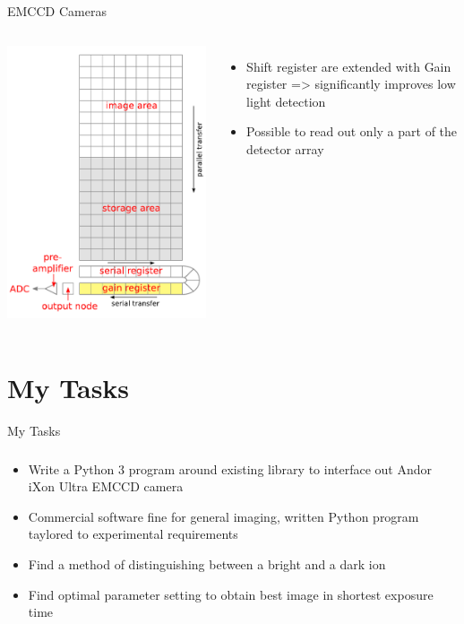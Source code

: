 \documentclass{beamer}
\begin{document}
\begin{frame}{EMCCD Cameras}




\begin{columns}
             \centering
             \includegraphics[width=4.3 cm]{Figures/EMCCD_Structure.PNG}
              \begin{itemize}
\item Shift register are extended with Gain register => significantly improves low light detection
\bigskip
\item Possible to read out only a part of the detector array
\end{itemize}
         \end{columns} 


\end{frame}


\section{My Tasks}

\begin{frame}{My Tasks}
\frametitle{}
\begin{itemize}
\item Write a Python 3 program around existing library to interface out Andor iXon Ultra EMCCD camera
\bigskip
\item Commercial software fine for general imaging, written Python program taylored to experimental requirements
\bigskip
\item Find a method of distinguishing between a bright and a dark ion
\bigskip
\item Find optimal parameter setting to obtain best image in shortest exposure time
\end{itemize}


\end{frame}
\end{document}

